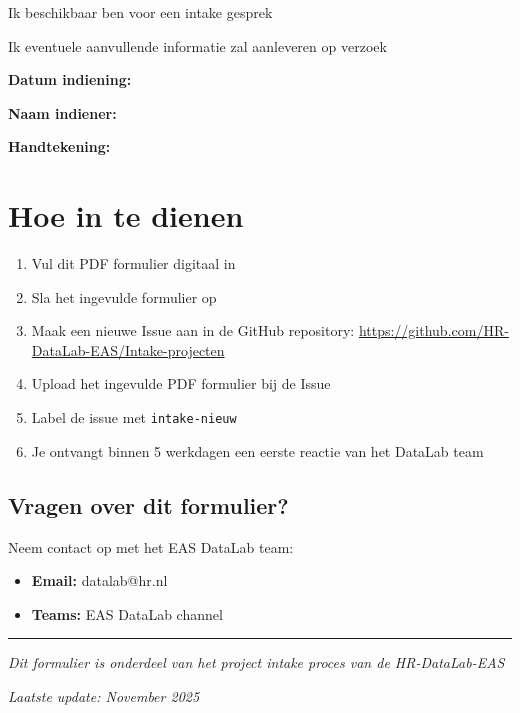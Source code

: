 \documentclass[a4paper,11pt]{article}
\newcommand{\textfield}[2]{\TextField[name=#1, width=#2, bordercolor={0 0 0}, backgroundcolor={0.95 0.95 0.95}]{}}
\newcommand{\checkbox}[1]{\CheckBox[name=#1, width=0.4cm, height=0.4cm, bordercolor={0 0 0}]{}}
\begin{document}
\begin{Form}
\vspace{0.2cm}
\noindent\checkbox{verklaring3} Ik beschikbaar ben voor een intake gesprek

\vspace{0.2cm}
\noindent\checkbox{verklaring4} Ik eventuele aanvullende informatie zal aanleveren op verzoek

\vspace{1cm}

\noindent\textbf{Datum indiening:} \textfield{datum_indiening}{6cm}

\vspace{0.5cm}

\noindent\textbf{Naam indiener:} \textfield{naam_indiener}{10cm}

\vspace{0.5cm}

\noindent\textbf{Handtekening:} \textfield{handtekening}{10cm}

\vspace{2cm}

\section*{Hoe in te dienen}

\begin{enumerate}[leftmargin=*]
    \item Vul dit PDF formulier digitaal in
    \item Sla het ingevulde formulier op
    \item Maak een nieuwe Issue aan in de GitHub repository: \url{https://github.com/HR-DataLab-EAS/Intake-projecten}
    \item Upload het ingevulde PDF formulier bij de Issue
    \item Label de issue met \texttt{intake-nieuw}
    \item Je ontvangt binnen 5 werkdagen een eerste reactie van het DataLab team
\end{enumerate}

\vspace{1cm}

\subsection*{Vragen over dit formulier?}

Neem contact op met het EAS DataLab team:
\begin{itemize}[leftmargin=*]
    \item \textbf{Email:} datalab@hr.nl
    \item \textbf{Teams:} EAS DataLab channel
\end{itemize}

\vspace{1cm}

\hrule

\vspace{0.3cm}

\noindent\textit{\small Dit formulier is onderdeel van het project intake proces van de HR-DataLab-EAS}

\noindent\textit{\small Laatste update: November 2025}

\end{Form}
\end{document}
